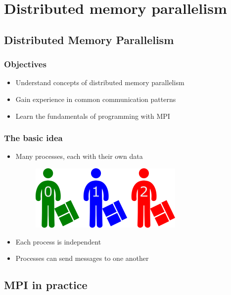 \section{Distributed memory
parallelism}\label{distributed-memory-parallelism}

\subsection{Distributed Memory
Parallelism}\label{distributed-memory-parallelism-1}

\subsubsection{Objectives}\label{objectives}

\begin{itemize}
\itemsep1pt\parskip0pt
\item
  Understand concepts of distributed memory parallelism
\item
  Gain experience in common communication patterns
\item
  Learn the fundamentals of programming with MPI
\end{itemize}

\subsubsection{The basic idea}\label{the-basic-idea}

\begin{itemize}
\item
  Many processes, each with their own data

  \begin{figure}[htbp]
  \centering
  \includegraphics{06MPI/figures/many.png}
  \end{figure}
\item
  Each process is independent
\item
  Processes can send messages to one another
\end{itemize}

\subsection{MPI in practice}\label{mpi-in-practice}

